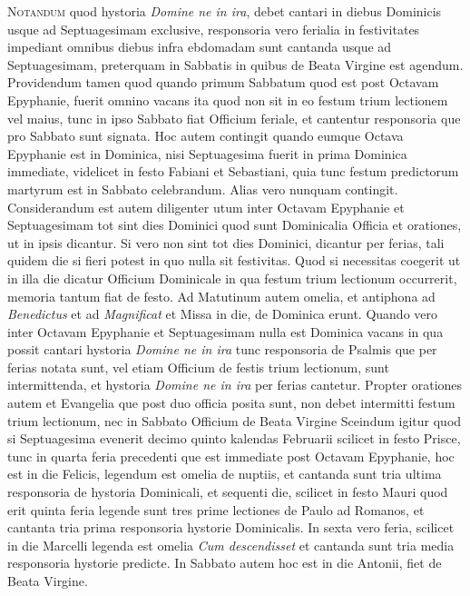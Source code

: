 \documentclass[11pt,openany]{book}
\newcommand*\zallmancaps{\usefont{U}{Zallman}{xl}{n}}
\newcommand{\ubsubsection}[2]{%
	\subsection*{#1}%
	\phantomsection%
	\addcontentsline{toc}{subsection}{#1}%
	\hypertarget{#2}{}%
}
\begin{document}
\begin{multicols*}{2}
\lettrine[lines=2]{\zallmancaps \color{Red} N}{otandum} quod hystoria \textit{Domine ne in ira}, debet cantari in diebus Dominicis usque ad Septuagesimam exclusive, responsoria vero ferialia in festivitates impediant omnibus diebus infra ebdomadam sunt cantanda usque ad Septuagesimam, preterquam in Sabbatis in quibus de Beata Virgine est agendum.
Providendum tamen quod quando primum Sabbatum quod est post Octavam Epyphanie, fuerit omnino vacans ita quod non sit in eo festum trium lectionem vel maius, tunc in ipso Sabbato fiat Officium feriale, et cantentur responsoria que pro Sabbato sunt signata.
Hoc autem contingit quando eumque Octava Epyphanie est in Dominica, nisi Septuagesima fuerit in prima Dominica immediate, videlicet in festo Fabiani et Sebastiani, quia tunc festum predictorum martyrum est in Sabbato celebrandum. Alias vero nunquam contingit.
Considerandum est autem diligenter utum inter Octavam Epyphanie et Septuagesimam tot sint dies Dominici quod sunt Dominicalia Officia et orationes, ut in ipsis dicantur. Si vero non sint tot dies Dominici, dicantur per ferias, tali quidem die si fieri potest in quo nulla sit festivitas. Quod si necessitas coegerit ut in illa die dicatur Officium Dominicale in qua festum trium lectionum occurrerit, memoria tantum fiat de festo.
Ad Matutinum autem omelia, et antiphona ad \textit{Benedictus} et ad \textit{Magnificat} et Missa in die, de Dominica erunt.
Quando vero inter Octavam Epyphanie et Septuagesimam nulla est Dominica vacans in qua possit cantari hystoria \textit{Domine ne in ira} tunc responsoria de Psalmis que per ferias notata sunt, vel etiam Officium de festis trium lectionum, sunt intermittenda, et hystoria \textit{Domine ne in ira} per ferias cantetur.
Propter orationes autem et Evangelia que post duo officia posita sunt, non debet intermitti festum trium lectionum, nec in Sabbato Officium de Beata Virgine
Sceindum igitur quod si Septuagesima evenerit decimo quinto kalendas Februarii scilicet in festo Prisce, tunc in quarta feria precedenti que est immediate post Octavam Epyphanie, hoc est in die Felicis, legendum est omelia de nuptiis, et cantanda sunt tria ultima responsoria de hystoria Dominicali, et sequenti die, scilicet in festo Mauri quod erit quinta feria legende sunt tres prime lectiones de Paulo ad Romanos, et cantanta tria prima responsoria hystorie Dominicalis. In sexta vero feria, scilicet in die Marcelli legenda est omelia \textit{Cum descendisset} et cantanda sunt tria media responsoria hystorie predicte. In Sabbato autem hoc est in die Antonii, fiet de Beata Virgine.

\end{multicols*}
\end{document}
